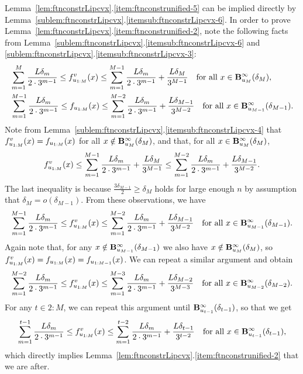 Lemma~\ref{lem:ftnconstrLipcvx}.\ref{item:ftnconstrunified-5} can be implied directly by Lemma~\ref{sublem:ftnconstrLipcvx}.\ref{itemsub:ftnconstrLipcvx-6}.
In order to prove Lemma~\ref{lem:ftnconstrLipcvx}.\ref{item:ftnconstrunified-2}, note the following facts from Lemma~\ref{sublem:ftnconstrLipcvx}.\ref{itemsub:ftnconstrLipcvx-6} and \ref{sublem:ftnconstrLipcvx}.\ref{itemsub:ftnconstrLipcvx-3}:
\begin{align*}
&\sum_{m=1}^{M} \frac{L\delta_m}{2\cdot3^{m-1}}
\leq
f_{u_{1:M}}^v (x)
\leq
\sum_{m=1}^{M-1} \frac{L\delta_m}{2\cdot3^{m-1}} +\frac{L\delta_{M}}{3^{M-1}}
\quad \text{for all } x \in \mathbf{B}^\infty_{u_{M}}({\delta_{M}}),\\
&\sum_{m=1}^{M-1} \frac{L\delta_m}{2\cdot3^{m-1}}
\leq
f_{u_{1:{M}}} (x)
\leq
\sum_{m=1}^{M-2} \frac{L\delta_m}{2\cdot3^{m-1}} +\frac{L\delta_{M-1}}{3^{M-2}}
\quad \text{for all } x \in \mathbf{B}^\infty_{u_{M-1}}({\delta_{M-1}}).
\end{align*}
Note from Lemma~\ref{sublem:ftnconstrLipcvx}.\ref{itemsub:ftnconstrLipcvx-4} that $f_{u_{1:M}}^v (x) = f_{u_{1:{M}}}(x)$ for all $x \notin \mathbf{B}^\infty_{u_{M}}({\delta_{M}})$, 
and that, for all $x \in \mathbf{B}^\infty_{u_{M}}({\delta_{M}})$,
\begin{equation*}
f_{u_{1:M}}^v (x)
\leq
\sum_{m=1}^{M-1} \frac{L\delta_m}{2\cdot3^{m-1}} +\frac{L\delta_{M}}{3^{M-1}}
\leq
\sum_{m=1}^{M-2} \frac{L\delta_m}{2\cdot3^{m-1}} +\frac{L\delta_{M-1}}{3^{M-2}}.
\end{equation*}
The last inequality is because $\frac{3 \delta_{M-1}}{2} \geq \delta_M$ holds for large enough $n$ by assumption
that $\delta_M = o(\delta_{M-1})$.
From these observations, we have
\begin{align*}
\sum_{m=1}^{M-1} \frac{L\delta_m}{2\cdot3^{m-1}}
\leq
f_{u_{1:M}}^v (x)
\leq
\sum_{m=1}^{M-2} \frac{L\delta_m}{2\cdot3^{m-1}} +\frac{L\delta_{M-1}}{3^{M-2}}
\quad \text{for all } x \in \mathbf{B}^\infty_{u_{M-1}}({\delta_{M-1}}).
\end{align*}
Again note that, for any $x \notin \mathbf{B}^\infty_{u_{M-1}}({\delta_{M-1}})$ we also have $x \notin \mathbf{B}^\infty_{u_{M}}({\delta_{M}})$, 
so $f_{u_{1:M}}^v(x) = f_{u_{1:{M}}}(x) = f_{u_{1:{M-1}}}(x)$. We can repeat a similar argument and obtain
\begin{align*}
\sum_{m=1}^{M-2} \frac{L\delta_m}{2\cdot3^{m-1}}
\leq
f_{u_{1:M}}^v (x)
\leq
\sum_{m=1}^{M-3} \frac{L\delta_m}{2\cdot3^{m-1}} +\frac{L\delta_{M-2}}{3^{M-3}}
\quad \text{for all } x \in \mathbf{B}^\infty_{u_{M-2}}({\delta_{M-2}}).
\end{align*}
For any $t \in 2:M$, we can repeat this argument until $\mathbf{B}^\infty_{u_{t-1}}({\delta_{t-1}})$, so that we get
\begin{align*}
\sum_{m=1}^{t-1} \frac{L\delta_m}{2\cdot3^{m-1}}
\leq
f_{u_{1:M}}^v (x)
\leq
\sum_{m=1}^{t-2} \frac{L\delta_m}{2\cdot3^{m-1}} +\frac{L\delta_{t-1}}{3^{t-2}}
\quad \text{for all } x \in \mathbf{B}^\infty_{u_{t-1}}({\delta_{t-1}}),
\end{align*}
which directly implies Lemma~\ref{lem:ftnconstrLipcvx}.\ref{item:ftnconstrunified-2} that we are after.

